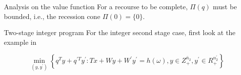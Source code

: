 \documentclass{beamerswitch}
\begin{document}
\begin{frame}[allowframebreaks]{Analysis on the value function}
    For a recourse to be complete, \(\Pi(q)\) must be bounded, i.e., the recession cone \(\Pi(0) = \{0\}\).

\end{frame}
\begin{frame}[allowframebreaks]{Two-stage integer program}
    For the integer second stage case, first look at the example in \cite{schultz_stochastic_2003}

    \[
        \min _{\left(y, y^{\prime}\right)}\left\{q^{T} y+q^{\prime T} y^{\prime}: T x+W y+W^{\prime} y^{\prime}=h(\omega), y \in Z _{+}^{\bar{n}_{2}}, y^{\prime} \in R _{+}^{n_{2}^{\prime}}\right\}
    \]
\end{frame}
\begin{frame}[allowframebreaks]
    
    
\end{frame}
\end{document}
